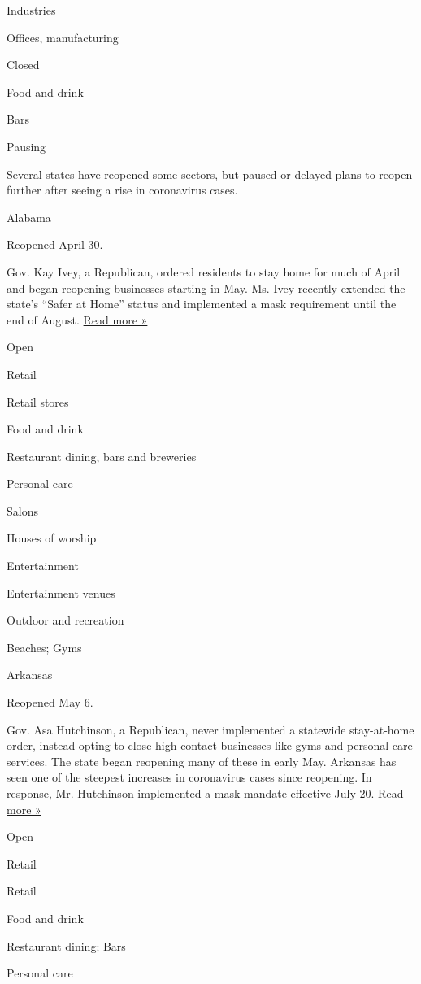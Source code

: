 Industries

Offices, manufacturing

Closed

Food and drink

Bars

Pausing

Several states have reopened some sectors, but paused or delayed plans
to reopen further after seeing a rise in coronavirus cases.

Alabama

Reopened April 30.

Gov. Kay Ivey, a Republican, ordered residents to stay home for much of
April and began reopening businesses starting in May. Ms. Ivey recently
extended the state's ``Safer at Home'' status and implemented a mask
requirement until the end of August.
\href{https://www.wsfa.com/2020/07/29/gov-ivey-update-public-states-repsonse-covid-/}{Read
more »}

Open

Retail

Retail stores

Food and drink

Restaurant dining, bars and breweries

Personal care

Salons

Houses of worship

Entertainment

Entertainment venues

Outdoor and recreation

Beaches; Gyms

Arkansas

Reopened May 6.

Gov. Asa Hutchinson, a Republican, never implemented a statewide
stay-at-home order, instead opting to close high-contact businesses like
gyms and personal care services. The state began reopening many of these
in early May. Arkansas has seen one of the steepest increases in
coronavirus cases since reopening. In response, Mr. Hutchinson
implemented a mask mandate effective July 20.
\href{https://www.kspr.com/content/news/Arkansas-governor-No-further-reopening-as-virus-cases-surge-571501921.html}{Read
more »}

Open

Retail

Retail

Food and drink

Restaurant dining; Bars

Personal care

